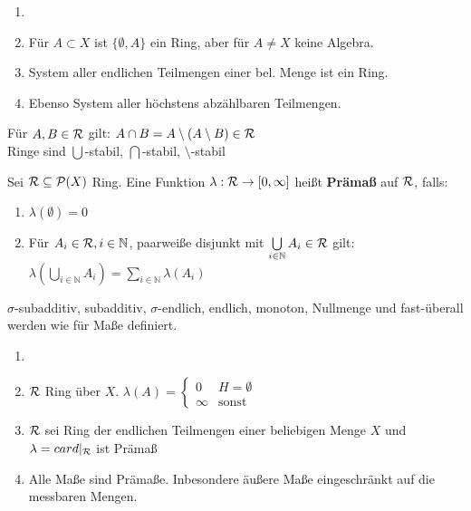 \documentclass[11pt,a4paper,fleqn,openany]{report}
\begin{document}
    \begin{example}
      \begin{enumerate}[label=\roman*)]
        \item[]
        \item Für $A \subset X$ ist $\{\emptyset, A\}$ ein Ring, aber für $A \neq X$ keine Algebra.
        \item System aller endlichen Teilmengen einer bel. Menge ist ein Ring.
        \item Ebenso System aller höchstens abzählbaren Teilmengen. 
      \end{enumerate}
    \end{example}

    \begin{remark}
      Für $A,B \in \mathcal{R}$ gilt: $A \cap B = A \setminus (A \setminus B) \in \mathcal{R}$\\
      Ringe sind $\bigcup$-stabil, $\bigcap$-stabil, $\setminus$-stabil
    \end{remark}

    \begin{definition}[Im Aufschrieb II.10]
      Sei $\mathcal{R} \subseteq \mathcal{P}(X)$ Ring. Eine Funktion $\lambda: \mathcal{R} \to [0, \infty]$ heißt \textbf{Prämaß} auf $\mathcal{R}$, falls:
      \begin{enumerate}[label=\roman*)]
        \item $\lambda(\emptyset) = 0$
        \item Für $A_i \in \mathcal{R}, i \in \mathbb{N}$, paarweiße disjunkt mit $\bigcup\limits_{i \in \mathbb{N}} A_i \in \mathcal{R}$ gilt:\\
        $\lambda(\bigcup\limits_{i \in \mathbb{N}} A_i) = \sum\limits_{i \in \mathbb{N}} \lambda(A_i) $
      \end{enumerate}
    \end{definition}

    \begin{remark}
      $\sigma$-subadditiv, subadditiv, $\sigma$-endlich, endlich, monoton, Nullmenge und fast-überall werden wie für Maße definiert. 
    \end{remark}

    \begin{example}
      \begin{enumerate}[label=\roman*)]
        \item[]
        \item $\mathcal{R}$ Ring über $X$. $\lambda(A) = \begin{cases}
                0 & H = \emptyset\\
                \infty & \text{sonst}
              \end{cases}$
        \item $\mathcal{R}$ sei Ring der endlichen Teilmengen einer beliebigen Menge $X$ und $\lambda = card|_{\mathcal{R}}$ ist Prämaß
        \item Alle Maße sind Prämaße. Inbesondere äußere Maße eingeschränkt auf die messbaren Mengen.
      \end{enumerate}
    \end{example}
\end{document}
